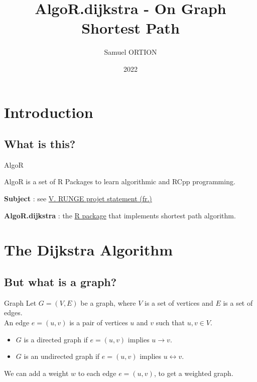 \documentclass[11pt]{beamer}
\author{ Samuel \textsc{ORTION} }
\title{ AlgoR.dijkstra - On Graph Shortest Path }
\institute{ Université d'Évry val d'Essone - Paris-Saclay }
\date{ 2022 }
\begin{document}
\begin{frame}
\titlepage
\end{frame}

\begin{frame}
\tableofcontents
\end{frame}

\section{Introduction}

\subsection{What is this?}

\begin{frame}{AlgoR}

AlgoR is a set of R Packages to learn algorithmic and RCpp programming.

\textbf{Subject} : see \href{https://github.com/vrunge/TSP/blob/main/simulations/projetsM2_Algorithmique_2022_2023.pdf}{V. RUNGE projet statement (fr.)}

\textbf{AlgoR.dijkstra} : the \href{https://github.com/UncleSamulus/AlgoR.dijkstra}{R package} that implements shortest path algorithm.

\end{frame}

\section{The Dijkstra Algorithm}

\subsection{But what is a graph?}

\begin{frame}{Graph}
	Let $G = (V, E)$ be a graph, where $V$ is a set of vertices and $E$ is a set of edges. \\
	An edge $e = (u, v)$ is a pair of vertices $u$ and $v$ such that $u, v \in V$. \\

	\begin{itemize}
		\item $G$ is a directed graph if $e = (u, v)$ implies $u \rightarrow v$.
		\item $G$ is an undirected graph if $e = (u, v)$ implies $u \leftrightarrow v$.
	\end{itemize}

	We can add a weight $w$ to each edge $e = (u, v)$, to get a weighted graph. \\
\end{frame}
\end{document}
